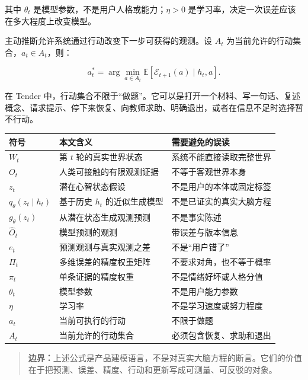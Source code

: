 \documentclass[UTF8,a4paper,11pt]{ctexart}
\newcommand{\boundary}[1]{\begin{quote}\noindent\textbf{\color{TenderPink}边界：}#1\end{quote}}
\begin{document}
其中 \(\theta_t\) 是模型参数，不是用户人格或能力；\(\eta>0\) 是学习率，决定一次误差应该在多大程度上改变模型。

主动推断允许系统通过行动改变下一步可获得的观测。设 \(A_t\) 为当前允许的行动集合，\(a_t\in A_t\)，则：

\begin{equation}
a_t^\ast
=\arg\min_{a\in A_t}
\mathbb E\left[
\mathcal E_{t+1}(a)\mid h_t,a
\right].
\end{equation}

在 Tender 中，行动集合不限于“做题”。它可以是打开一个材料、写一句话、复述概念、请求提示、停下来恢复、向教师求助、明确退出，或者在信息不足时选择暂不行动。

\begin{center}
\begin{longtable}{@{}p{2.7cm}p{5.3cm}p{5.1cm}@{}}
\toprule
\textbf{符号} & \textbf{本文含义} & \textbf{需要避免的误读} \\
\midrule
\(W_t\) & 第 \(t\) 轮的真实世界状态 & 系统不能直接读取完整世界 \\
\(O_t\) & 人类可接触的有限观测证据 & 不等于客观世界本身 \\
\(z_t\) & 潜在心智状态假设 & 不是用户的本体或固定标签 \\
\(q_\theta(z_t\mid h_t)\) & 基于历史 \(h_t\) 的近似生成模型 & 不是已证实的真实大脑方程 \\
\(g_\theta(z_t)\) & 从潜在状态生成观测预测 & 不是事实陈述 \\
\(\hat O_t\) & 模型预测的观测 & 带误差与版本信息 \\
\(e_t\) & 预测观测与真实观测之差 & 不是“用户错了” \\
\(\Pi_t\) & 多维误差的精度权重矩阵 & 不要求对角，也不等于概率 \\
\(\pi_t\) & 单条证据的精度权重 & 不是情绪好坏或人格分值 \\
\(\theta_t\) & 模型参数 & 不是用户能力参数 \\
\(\eta\) & 学习率 & 不是学习速度或努力程度 \\
\(a_t\) & 当前可执行的行动 & 不限于做题 \\
\(A_t\) & 当前允许的行动集合 & 必须包含恢复、求助和退出 \\
\bottomrule
\end{longtable}
\end{center}

\boundary{上述公式是产品建模语言，不是对真实大脑方程的断言。它们的价值在于把预测、误差、精度、行动和更新写成可测量、可反驳的对象。}
\end{document}
